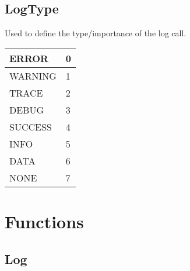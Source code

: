 \documentclass[letterpaper,10pt,english]{sphinxmanual}
\begin{document}
\subsection{LogType}
\label{\detokenize{log:logtype}}

\begin{fulllineitems}
\label{\detokenize{log:_CPPv2N6pessum7LogTypeE}}%
\pysigstartmultiline
{}%
\pysigstopmultiline
Used to define the type/importance of the log call.


\begin{savenotes}\sphinxattablestart
\centering
\begin{tabulary}{\linewidth}[t]{|T|T|}
\hline

ERROR
&
0
\\
\hline
WARNING
&
1
\\
\hline
TRACE
&
2
\\
\hline
DEBUG
&
3
\\
\hline
SUCCESS
&
4
\\
\hline
INFO
&
5
\\
\hline
DATA
&
6
\\
\hline
NONE
&
7
\\
\hline
\end{tabulary}
\par
\sphinxattableend\end{savenotes}

\end{fulllineitems}



\section{Functions}
\label{\detokenize{log:functions}}

\subsection{Log}
\label{\detokenize{log:log}}
\end{document}
